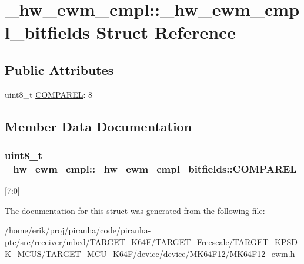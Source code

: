 \hypertarget{struct__hw__ewm__cmpl_1_1__hw__ewm__cmpl__bitfields}{}\section{\+\_\+hw\+\_\+ewm\+\_\+cmpl\+:\+:\+\_\+hw\+\_\+ewm\+\_\+cmpl\+\_\+bitfields Struct Reference}
\label{struct__hw__ewm__cmpl_1_1__hw__ewm__cmpl__bitfields}
\subsection*{Public Attributes}
\begin{DoxyCompactItemize}
\item 
uint8\+\_\+t \hyperlink{struct__hw__ewm__cmpl_1_1__hw__ewm__cmpl__bitfields_ad1802814942e34c6a756942c7c2aa018}{C\+O\+M\+P\+A\+R\+EL}\+: 8
\end{DoxyCompactItemize}


\subsection{Member Data Documentation}
\subsubsection[{\texorpdfstring{C\+O\+M\+P\+A\+R\+EL}{COMPAREL}}]{\setlength{\rightskip}{0pt plus 5cm}uint8\+\_\+t \+\_\+hw\+\_\+ewm\+\_\+cmpl\+::\+\_\+hw\+\_\+ewm\+\_\+cmpl\+\_\+bitfields\+::\+C\+O\+M\+P\+A\+R\+EL}\hypertarget{struct__hw__ewm__cmpl_1_1__hw__ewm__cmpl__bitfields_ad1802814942e34c6a756942c7c2aa018}{}\label{struct__hw__ewm__cmpl_1_1__hw__ewm__cmpl__bitfields_ad1802814942e34c6a756942c7c2aa018}
\mbox{[}7\+:0\mbox{]} 

The documentation for this struct was generated from the following file\+:\begin{DoxyCompactItemize}
\item 
/home/erik/proj/piranha/code/piranha-\/ptc/src/receiver/mbed/\+T\+A\+R\+G\+E\+T\+\_\+\+K64\+F/\+T\+A\+R\+G\+E\+T\+\_\+\+Freescale/\+T\+A\+R\+G\+E\+T\+\_\+\+K\+P\+S\+D\+K\+\_\+\+M\+C\+U\+S/\+T\+A\+R\+G\+E\+T\+\_\+\+M\+C\+U\+\_\+\+K64\+F/device/device/\+M\+K64\+F12/M\+K64\+F12\+\_\+ewm.\+h\end{DoxyCompactItemize}
